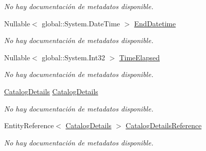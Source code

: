 \begin{DoxyCompactItemize}
\begin{DoxyCompactList}\small\item\em No hay documentación de metadatos disponible. \end{DoxyCompactList}\item 
Nullable$<$ global\-::\-System.\-Date\-Time $>$ \hyperlink{class_microsoft_1_1_samples_1_1_kinect_1_1_basic_interactions_1_1_catalog_detail_interactions_a1af864e2e6d7ff52ad89c73d0dcc36eb}{End\-Datetime}
\begin{DoxyCompactList}\small\item\em No hay documentación de metadatos disponible. \end{DoxyCompactList}\item 
Nullable$<$ global\-::\-System.\-Int32 $>$ \hyperlink{class_microsoft_1_1_samples_1_1_kinect_1_1_basic_interactions_1_1_catalog_detail_interactions_ac8bff2e768ddb7e6e03005143683f398}{Time\-Elapsed}
\begin{DoxyCompactList}\small\item\em No hay documentación de metadatos disponible. \end{DoxyCompactList}\item 
\hyperlink{class_microsoft_1_1_samples_1_1_kinect_1_1_basic_interactions_1_1_catalog_details}{Catalog\-Details} \hyperlink{class_microsoft_1_1_samples_1_1_kinect_1_1_basic_interactions_1_1_catalog_detail_interactions_a16aecd8eda1df6a600e01386f291170a}{Catalog\-Details}
\begin{DoxyCompactList}\small\item\em No hay documentación de metadatos disponible. \end{DoxyCompactList}\item 
Entity\-Reference$<$ \hyperlink{class_microsoft_1_1_samples_1_1_kinect_1_1_basic_interactions_1_1_catalog_details}{Catalog\-Details} $>$ \hyperlink{class_microsoft_1_1_samples_1_1_kinect_1_1_basic_interactions_1_1_catalog_detail_interactions_a10c5898da84487a5e321ccac21e486ec}{Catalog\-Details\-Reference}
\begin{DoxyCompactList}\small\item\em No hay documentación de metadatos disponible. \end{DoxyCompactList}\end{DoxyCompactItemize}


